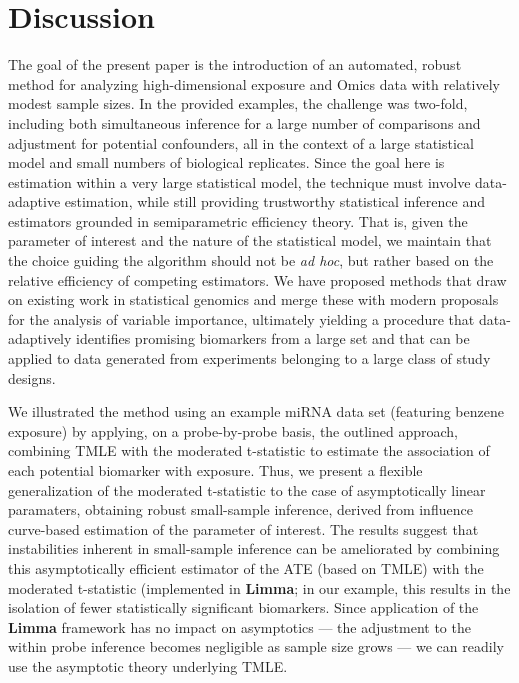 \chapter{Discussion}

The goal of the present paper is the introduction of an automated, robust
method for analyzing high-dimensional exposure and Omics data with relatively
modest sample sizes. In the provided examples, the challenge was two-fold,
including both simultaneous inference for a large number of comparisons and
adjustment for potential confounders, all in the context of a large statistical
model and small numbers of biological replicates. Since the goal here is
estimation within a very large statistical model, the technique must involve
data-adaptive estimation, while still providing trustworthy statistical
inference and estimators grounded in semiparametric efficiency theory. That is,
given the parameter of interest and the nature of the statistical model, we
maintain that the choice guiding the algorithm should not be \textit{ad hoc},
but rather based on the relative efficiency of competing estimators. We have
proposed methods that draw on existing work in statistical genomics and merge
these with modern proposals for the analysis of variable importance, ultimately
yielding a procedure that data-adaptively identifies promising biomarkers from
a large set and that can be applied to data generated from experiments
belonging to a large class of study designs.

We illustrated the method using an example miRNA data set (featuring benzene
exposure) by applying, on a probe-by-probe basis, the outlined approach,
combining TMLE with the moderated t-statistic to estimate the association of
each potential biomarker with exposure. Thus, we present a flexible
generalization of the moderated t-statistic to the case of asymptotically
linear paramaters, obtaining robust small-sample inference, derived from
influence curve-based estimation of the parameter of interest. The results
suggest that instabilities inherent in small-sample inference can be
ameliorated by combining this asymptotically efficient estimator of the ATE
(based on TMLE) with the moderated t-statistic (implemented in \textbf{Limma};
in our example, this results in the isolation of fewer statistically significant
biomarkers. Since application of the \textbf{Limma} framework has no impact on
asymptotics --- the adjustment to the within probe inference becomes negligible
as sample size grows --- we can readily use the asymptotic theory underlying
TMLE.

